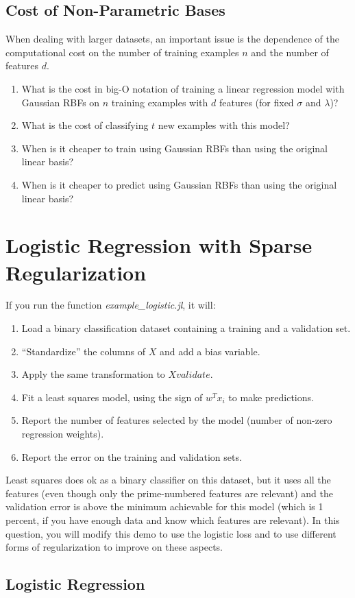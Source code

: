 \documentclass{article}
\def\blu#1{{\color{blu}#1}}
\def\enum#1{\begin{enumerate}#1\end{enumerate}}
\begin{document}
\subsection{Cost of Non-Parametric Bases}

When dealing with larger datasets, an important issue is the dependence of the computational cost on the number of training examples $n$ and the number of features $d$. 
\blu{
\enum{
\item What is the cost in big-O notation of training a linear regression model with Gaussian RBFs on $n$ training examples with $d$ features (for fixed $\sigma$ and $\lambda$)? 
\item What is the cost of classifying $t$ new examples with this model? 
\item When is it cheaper to train using Gaussian RBFs than using the original linear basis? 
\item When is it cheaper to predict using Gaussian RBFs than using the original linear basis?
}}


\section{Logistic Regression with Sparse Regularization}

If you run the function \emph{example\_logistic.jl}, it will:
\enum{
\item Load a binary classification dataset containing a training and a validation set.
\item ``Standardize'' the columns of $X$ and add a bias variable.
\item Apply the same transformation to $Xvalidate$.
\item Fit a least squares model, using the sign of $w^Tx_i$ to make predictions.
\item Report the number of features selected by the model (number of non-zero regression weights).
\item Report the error on the training and validation sets.
}
Least squares does ok as a binary classifier on this dataset, but it uses all the features (even though only the prime-numbered features are relevant) and the validation error is above the minimum achievable for this model (which is 1 percent, if you have enough data and know which features are relevant). In this question, you will modify this demo to use the logistic loss and to use different forms of regularization to improve on these aspects.


\subsection{Logistic Regression}
\end{document}
